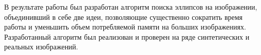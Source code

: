 \Conc
В результате работы был разработан алгоритм поиска эллипсов на изображении, объединивший в себе две идеи, 
позволяющие существенно сократить время работы и уменьшить объем потребляемой памяти на больших изображениях.
Разработанный алгоритм был реализован и проверен на ряде синтетических и реальных изображений. 

\printbibliography[%
    heading=bibintoc%
]


